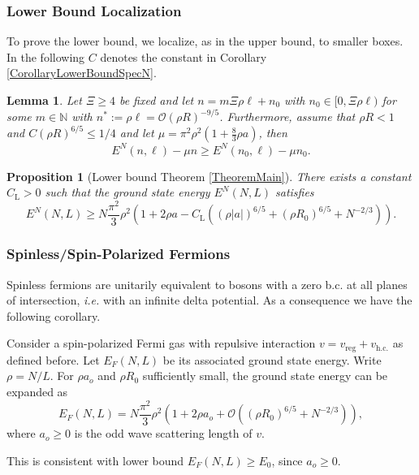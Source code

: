 \documentclass{beamer}[10]
\newcommand{\abs}[1]{\left\lvert #1 \right\rvert}
\newcommand{\ie}{\emph{i.e.} }
\newtheorem{mproposition}{Proposition}
\newtheorem{mlemma}{Lemma}
\begin{document}
\begin{frame}
	\frametitle{Lower Bound Localization}
	\begin{block}{}
	\small	To prove the lower bound, we localize, as in the upper bound, to smaller boxes. In the following $C$ denotes the constant in Corollary \ref{CorollaryLowerBoundSpecN}.
		\begin{mlemma}\label{LemmaLocalizationFbound}
			Let $ \Xi\geq 4 $ be fixed and let $ n=m\Xi \rho \ell+n_0 $ with $ n_0\in[0,\Xi\rho \ell) $ for some $ m\in\mathbb{N} $ with $ n^{\ast}:=\rho\ell=\mathcal{O}(\rho R)^{-9/5} $. Furthermore, assume that $ \rho R<1 $ and $ C(\rho R)^{6/5}\leq  1/4 $ and let $ \mu=\pi^2\rho^2\left(1+\frac{8}{3}\rho a\right) $, then \begin{equation}
			E^{N}(n,\ell)-\mu n \geq E^{N}(n_0,\ell)-\mu n_0.
			\end{equation}
		\end{mlemma}
		\begin{mproposition}[Lower bound Theorem \ref{TheoremMain}]
			\label{PropositionLowerBound}
			There exists a constant $C_\text{L}>0$ such that the ground state energy $E^N(N,L)$ satisfies
			\begin{equation}
			\label{eqlower}
			E^N(N,L)\geq N\frac{\pi^2}{3}\rho^2\left(1+2\rho a-C_\text{L}\left((\rho\abs{a})^{6/5}+(\rho R_0)^{6/5}+N^{-2/3}\right)\right).
			\end{equation}
		\end{mproposition}
	\end{block}	
\end{frame}
\begin{frame}
	\frametitle{Spinless/Spin-Polarized Fermions}
	Spinless fermions are unitarily equivalent to bosons with a zero b.c. at all planes of intersection, \ie with an infinite delta potential. As a consequence we have the following corollary. 
	\begin{theorem}\label{TheoremFermion}
		Consider a spin-polarized Fermi gas with repulsive interaction  $v=v_{\text{reg}}+v_{\text{h.c.}}$ as defined before. Let $ E_F(N,L)$ be its associated ground state energy. Write $\rho=N/L$. For $\rho a_o$ and $\rho R_0$ sufficiently small, the ground state energy can be expanded as 
		\begin{equation}
		E_F(N,L)=N\frac{\pi^2}{3}\rho^2\left(1+2\rho a_o+\mathcal{O}\left(\left(\rho R_0\right)^{6/5}+N^{-2/3}\right)\right),
		\end{equation}
		where $ a_o\geq0 $ is the odd wave scattering length of $v$. 
	\end{theorem} 
	This is consistent with lower bound $ E_F(N,L)\geq E_0 $, since $ a_o\geq 0 $.
\end{frame}
\end{document}

